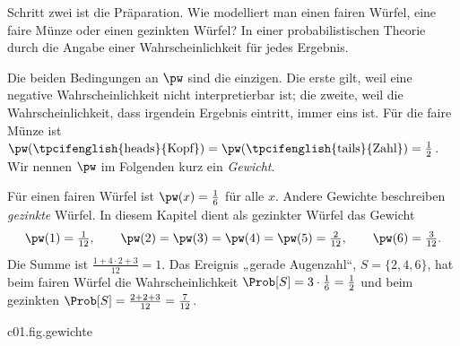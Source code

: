 Schritt zwei ist die Präparation. Wie modelliert man einen fairen Würfel, eine faire Münze
oder einen gezinkten Würfel? In einer probabilistischen Theorie durch die Angabe einer
Wahrscheinlichkeit für jedes Ergebnis.


Die beiden Bedingungen an $\pw$ sind die einzigen. Die erste gilt, weil eine negative
Wahrscheinlichkeit nicht interpretierbar ist; die zweite, weil die Wahrscheinlichkeit, dass
irgendein Ergebnis eintritt, immer eins ist. Für die faire Münze ist
$\pw(\text{\tpcifenglish{heads}{Kopf}}) = \pw(\text{\tpcifenglish{tails}{Zahl}}) = \tfrac12$.
Wir nennen $\pw$ im Folgenden kurz ein \emph{Gewicht}.

\begin{example}\label{c01.ex.gezinkt}
  Für einen fairen Würfel ist $\pw(x) = \tfrac16$ für alle $x$. Andere Gewichte beschreiben
  \emph{gezinkte} Würfel. In diesem Kapitel dient als gezinkter Würfel das Gewicht
  \begin{equation}\label{c01.eq.gezinkt}
    \pw(1) = \tfrac{1}{12}, \qquad
    \pw(2) = \pw(3) = \pw(4) = \pw(5) = \tfrac{2}{12}, \qquad
    \pw(6) = \tfrac{3}{12} .
  \end{equation}
  Die Summe ist $\tfrac{1 + 4\cdot 2 + 3}{12} = 1$. Das Ereignis „gerade Augenzahl“,
  $S = \{2,4,6\}$, hat beim fairen Würfel die Wahrscheinlichkeit
  $\Prob[S] = 3\cdot\tfrac16 = \tfrac12$ und beim gezinkten
  $\Prob[S] = \tfrac{2 + 2 + 3}{12} = \tfrac{7}{12}$.
\end{example}

\begin{tpcfigure}{c01.fig.gewichte}

  \caption{Drei Gewichte auf der Ergebnismenge $\{1, \dots, 6\}$ eines Würfels. Die Höhe
    eines Balkens ist $\pw(x)$; in jedem Bild ist die Summe aller Höhen $1$. (a) Fairer
    Würfel. (b) Der gezinkte Würfel aus Gleichung~\eqref{c01.eq.gezinkt}. (c) Ein
    Punktgewicht: Das ganze Gewicht liegt auf dem Ergebnis $3$. Solche Gewichte beschreiben
    deterministische Präparationen (Proposition~\ref{c01.prop.punktgewicht}).}
\end{tpcfigure}

